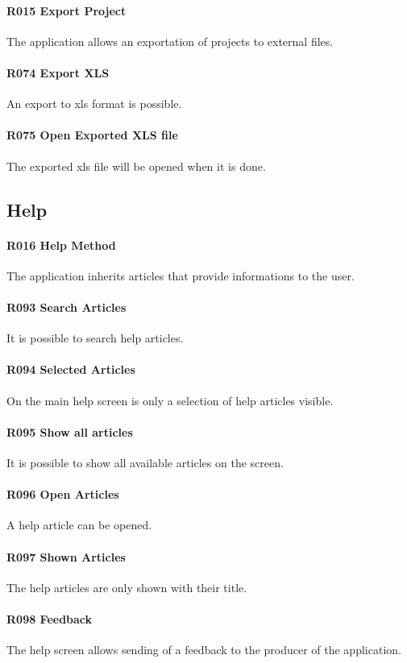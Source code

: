 \paragraph{R015 Export Project}
The application allows an exportation of projects to external files.
\paragraph{R074 Export XLS}
An export to xls format is possible.
\paragraph{R075 Open Exported XLS file}
The exported xls file will be opened when it is done.

\subsection{Help}
\paragraph{R016 Help Method}
The application inherits articles that provide informations to the user.
\paragraph{R093 Search Articles}
It is possible to search help articles.
\paragraph{R094 Selected Articles}
On the main help screen is only a selection of help articles visible.
\paragraph{R095 Show all articles}
It is possible to show all available articles on the screen.
\paragraph{R096 Open Articles}
A help article can be opened.
\paragraph{R097 Shown Articles}
The help articles are only shown with their title.
\paragraph{R098 Feedback}
The help screen allows sending of a feedback to the producer of the application.

